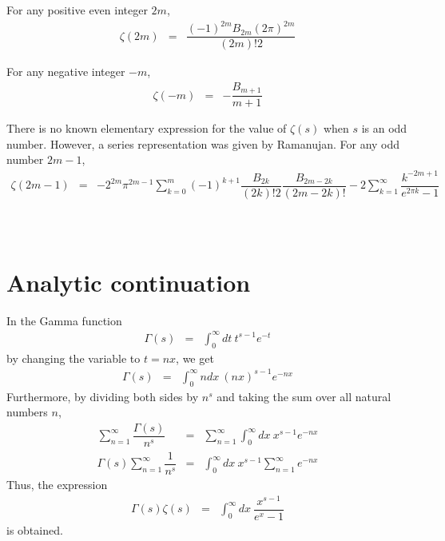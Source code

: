 \documentclass[uplatex,a4j,12pt,dvipdfmx]{jsarticle}
\begin{document}
For any positive even integer $2m$,
\begin{eqnarray}
	\zeta(2m)
	&=&
	\dfrac{(-1)^{2m} B_{2m} (2 \pi)^{2m} }{(2m)! 2}
\end{eqnarray}

For any negative integer $-m$,
\begin{eqnarray}
	\zeta(-m)
	&=&
	-
	\dfrac{B_{m+1}}{m+1}
\end{eqnarray}

There is no known elementary expression for the value of $\zeta(s)$ when $s$ is an odd number.
However, a series representation was given by Ramanujan.
For any odd number $2m-1$,
\begin{eqnarray}
	\zeta(2m-1)
	&=&
	-
	2^{2m} \pi^{2m-1}
	\sum_{k=0}^{m}
	(-1)^{k+1}
	\dfrac{B_{2k}}{(2k)!2}
	\dfrac{B_{2m-2k}}{(2m-2k)!}
	-
	2
	\sum_{k=1}^{\infty}
	\dfrac{ k^{-2m+1} }{ e^{2 \pi k} - 1 }
\end{eqnarray}

${}$

${}$

${}$

\section{Analytic continuation}

In the Gamma function
\begin{eqnarray}
	\Gamma(s)
	&=&
	\int^{\infty}_{0}
	\!\! dt
	\ \! t^{s-1} e^{-t}
\end{eqnarray}
by changing the variable to $t=nx$, we get
\begin{eqnarray}
	\Gamma(s)
	&=&
	\int^{\infty}_{0}
	\!\! ndx
	\ \! (nx)^{s-1} e^{-nx}
	\label{eqn:1302120225hayonena}
\end{eqnarray}
Furthermore, by dividing both sides by $n^{s}$ and taking the sum over all natural numbers $n$,
\begin{eqnarray}
	\sum_{n=1}^{\infty}
	\dfrac{ \Gamma(s) }{ n^{s} }
	&=&
	\sum_{n=1}^{\infty}
	\int^{\infty}_{0}
	\!\! dx
	\ \! x^{s-1} e^{-nx}
	\nonumber \\
	\Gamma(s)
	\sum_{n=1}^{\infty}
	\dfrac{ 1 }{ n^{s} }
	&=&
	\int^{\infty}_{0}
	\!\! dx
	\ \! x^{s-1}
	\sum_{n=1}^{\infty}
	e^{-nx}
\end{eqnarray}
Thus, the expression
\begin{eqnarray}
	\Gamma(s)
	\zeta(s)
	&=&
	\int^{\infty}_{0}
	\!\! dx
	\ \!
	\dfrac{x^{s-1}}{e^{x} - 1}
	\label{eqn:1302120248nerana}
\end{eqnarray}
is obtained.
\end{document}
